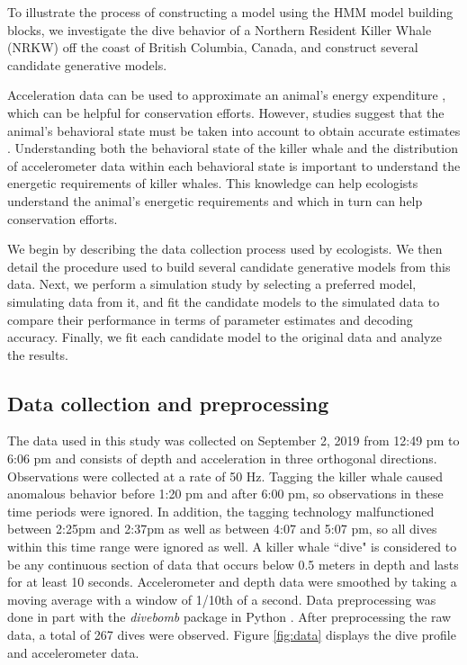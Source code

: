 

To illustrate the process of constructing a model using the HMM model building blocks, we investigate the dive behavior of a Northern Resident Killer Whale (NRKW) off the coast of British Columbia, Canada, and construct several candidate generative models.

Acceleration data can be used to approximate an animal's energy expenditure \citep{Green:2009,Wilson:2019}, which can be helpful for conservation efforts. However, studies suggest that the animal's behavioral state must be taken into account to obtain accurate estimates \citep{Dot:2016}. Understanding both the behavioral state of the killer whale and the distribution of accelerometer data within each behavioral state is important to understand the energetic requirements of killer whales. This knowledge can help ecologists understand the animal's energetic requirements and which in turn can help conservation efforts.

We begin by describing the data collection process used by ecologists. We then detail the procedure used to build several candidate generative models from this data. Next, we perform a simulation study by selecting a preferred model, simulating data from it, and fit the candidate models to the simulated data to compare their performance in terms of parameter estimates and decoding accuracy. Finally, we fit each candidate model to the original data and analyze the results.

\subsection{Data collection and preprocessing}

The data used in this study was collected on September 2, 2019 from 12:49 pm to 6:06 pm and consists of depth and acceleration in three orthogonal directions. Observations were collected at a rate of 50 Hz. Tagging the killer whale caused anomalous behavior before 1:20 pm and after 6:00 pm, so observations in these time periods were ignored. In addition, the tagging technology malfunctioned between 2:25pm and 2:37pm as well as between 4:07 and 5:07 pm, so all dives within this time range were ignored as well. A killer whale ``dive" is considered to be any continuous section of data that occurs below 0.5 meters in depth and lasts for at least 10 seconds. Accelerometer and depth data were smoothed by taking a moving average with a window of 1/10th of a second. Data preprocessing was done in part with the \textit{divebomb} package in Python \citep{Nunes:2018}. After preprocessing the raw data, a total of 267 dives were observed. Figure \ref{fig:data} displays the dive profile and accelerometer data.


